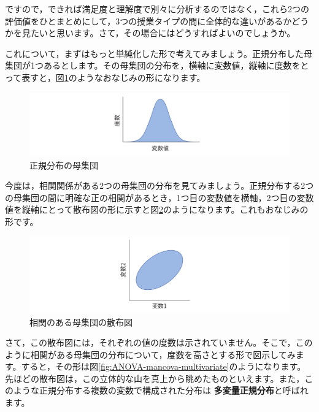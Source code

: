 \documentclass[
  12pt,
  a5jpaper,
  lualatex, ja=standard]{bxjsbook}
\renewcommand{\emph}[1]{\textbf{\color{emph} #1}}
\begin{document}
ですので，できれば満足度と理解度で別々に分析するのではなく，これら2つの評価値をひとまとめにして，3つの授業タイプの間に全体的な違いがあるかどうかを見たいと思います。さて，その場合にはどうすればよいのでしょうか。

これについて，まずはもっと単純化した形で考えてみましょう。正規分布した母集団が1つあるとします。その母集団の分布を，横軸に変数値，縦軸に度数をとって表すと，図\ref{fig:ANOVA-mancova-normdist}のようなおなじみの形になります。

\begin{figure}[!ht]

{\centering \includegraphics[width=1\linewidth]{images/ANOVA/mancova-normdist} 

}

\caption{正規分布の母集団}\label{fig:ANOVA-mancova-normdist}
\end{figure}

今度は，相関関係がある2つの母集団の分布を見てみましょう。正規分布する2つの母集団の間に明確な正の相関があるとき，1つ目の変数値を横軸，2つ目の変数値を縦軸にとって散布図の形に示すと図\ref{fig:ANOVA-mancova-correlation}のようになります。これもおなじみの形です。

\begin{figure}[!ht]

{\centering \includegraphics[width=1\linewidth]{images/ANOVA/mancova-correlation} 

}

\caption{相関のある母集団の散布図}\label{fig:ANOVA-mancova-correlation}
\end{figure}

さて，この散布図には，それぞれの値の度数は示されていません。そこで，このように相関がある母集団の分布について，度数を高さとする形で図示してみます。すると，その形は図\ref{fig:ANOVA-mancova-multivariate}のようになります。先ほどの散布図は，この立体的な山を真上から眺めたものといえます。また，このような正規分布する複数の変数で構成された分布は\emph{多変量正規分布}と呼ばれます。
\end{document}
